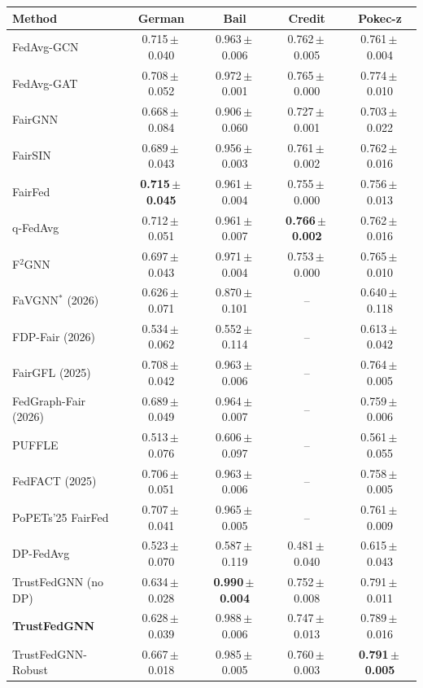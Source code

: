\begin{tabular}{lcccc}
\toprule
Method & German & Bail & Credit & Pokec-z \\
\midrule
FedAvg-GCN & 0.715\,$\pm$\,0.040 & 0.963\,$\pm$\,0.006 & 0.762\,$\pm$\,0.005 & 0.761\,$\pm$\,0.004 \\
FedAvg-GAT & 0.708\,$\pm$\,0.052 & 0.972\,$\pm$\,0.001 & 0.765\,$\pm$\,0.000 & 0.774\,$\pm$\,0.010 \\
FairGNN & 0.668\,$\pm$\,0.084 & 0.906\,$\pm$\,0.060 & 0.727\,$\pm$\,0.001 & 0.703\,$\pm$\,0.022 \\
FairSIN & 0.689\,$\pm$\,0.043 & 0.956\,$\pm$\,0.003 & 0.761\,$\pm$\,0.002 & 0.762\,$\pm$\,0.016 \\
FairFed & \textbf{0.715\,$\pm$\,0.045} & 0.961\,$\pm$\,0.004 & 0.755\,$\pm$\,0.000 & 0.756\,$\pm$\,0.013 \\
q-FedAvg & 0.712\,$\pm$\,0.051 & 0.961\,$\pm$\,0.007 & \textbf{0.766\,$\pm$\,0.002} & 0.762\,$\pm$\,0.016 \\
F$^2$GNN & 0.697\,$\pm$\,0.043 & 0.971\,$\pm$\,0.004 & 0.753\,$\pm$\,0.000 & 0.765\,$\pm$\,0.010 \\
FaVGNN$^{\ast}$ (2026) & 0.626\,$\pm$\,0.071 & 0.870\,$\pm$\,0.101 & -- & 0.640\,$\pm$\,0.118 \\
FDP-Fair (2026) & 0.534\,$\pm$\,0.062 & 0.552\,$\pm$\,0.114 & -- & 0.613\,$\pm$\,0.042 \\
FairGFL (2025) & 0.708\,$\pm$\,0.042 & 0.963\,$\pm$\,0.006 & -- & 0.764\,$\pm$\,0.005 \\
FedGraph-Fair (2026) & 0.689\,$\pm$\,0.049 & 0.964\,$\pm$\,0.007 & -- & 0.759\,$\pm$\,0.006 \\
PUFFLE & 0.513\,$\pm$\,0.076 & 0.606\,$\pm$\,0.097 & -- & 0.561\,$\pm$\,0.055 \\
FedFACT (2025) & 0.706\,$\pm$\,0.051 & 0.963\,$\pm$\,0.006 & -- & 0.758\,$\pm$\,0.005 \\
PoPETs'25 FairFed & 0.707\,$\pm$\,0.041 & 0.965\,$\pm$\,0.005 & -- & 0.761\,$\pm$\,0.009 \\
\midrule
DP-FedAvg & 0.523\,$\pm$\,0.070 & 0.587\,$\pm$\,0.119 & 0.481\,$\pm$\,0.040 & 0.615\,$\pm$\,0.043 \\
TrustFedGNN (no DP) & 0.634\,$\pm$\,0.028 & \textbf{0.990\,$\pm$\,0.004} & 0.752\,$\pm$\,0.008 & 0.791\,$\pm$\,0.011 \\
\textbf{TrustFedGNN} & 0.628\,$\pm$\,0.039 & 0.988\,$\pm$\,0.006 & 0.747\,$\pm$\,0.013 & 0.789\,$\pm$\,0.016 \\
TrustFedGNN-Robust & 0.667\,$\pm$\,0.018 & 0.985\,$\pm$\,0.005 & 0.760\,$\pm$\,0.003 & \textbf{0.791\,$\pm$\,0.005} \\
\bottomrule
\end{tabular}